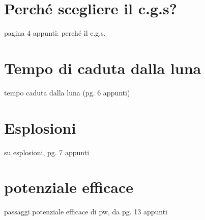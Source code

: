 
\chapter{Perché scegliere il c.g.s?}

 pagina 4 appunti: perché il c.g.s.

\chapter{Tempo di caduta dalla luna} 
tempo caduta dalla luna (pg. 6 appunti)

\chapter{Esplosioni}
su esplosioni, pg. 7 appunti

\chapter{potenziale efficace}
passaggi potenziale efficace di pw, da pg. 13 appunti
